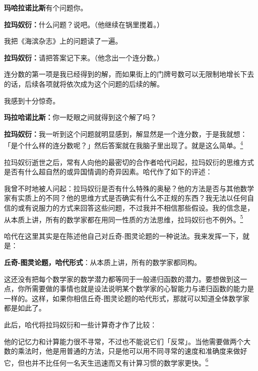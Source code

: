 \documentclass[
  12pt,
  twoside,
  openright,
  oldfontcommands,
]{memoir}
\newcommand{\kaitismall}[1]{{\kaitifamily\small #1}}
\newcommand{\heititext}[1]{{\heifamily\bfseries #1}}
\newcommand{\dialogname}[1]{{\heifamily\bfseries #1}}
\newenvironment{fsquote}{%
  \begin{mdframed}[style=gebquote]\kaitifamily\small%
}{%
  \end{mdframed}%
}
\begin{document}
\dialogname{玛哈拉诺比斯}有个问题你。

\dialogname{拉玛奴衍：}什么问题？说吧。\kaitismall{（他继续在锅里搅着。）}

\begin{fsquote}
我把《海滨杂志》上的问题读了一遍。
\end{fsquote}

\dialogname{拉玛奴衍：}请把答案记下来。\kaitismall{（他念出一个连分数。）}

连分数的第一项是我已经得到的解，而如果街上的门牌号数可以无限制地增长下去的话，后续各项就将依次成为这个问题的后续的解。

\begin{fsquote}
我感到十分惊奇。
\end{fsquote}

\dialogname{玛拉哈诺比斯：}你一眨眼之间就得到这个解了吗？

\dialogname{拉玛奴衍：}我一听到这个问题就明显感到，解显然是一个连分数，于是我就想：「是个什么样的连分数呢？」然后答案就在我脑子里出现了。就是这么简单。\hyperref[fn:Chapter17-4]{\textsuperscript{4}}

拉玛奴衍逝世之后，常有人向他的最密切的合作者哈代问起，拉玛奴衍的思维方式是否有什么超自然的或异国情调的奇异因素。哈代作了如下的评述：

\begin{fsquote}
我曾不时地被人问起：拉玛奴衍是否有什么特殊的奥秘？他的方法是否与其他数学家有实质上的不同？他的思维方式是否确实有什么不正规的东西？我无法以任何自信的或有说服力的方式来回答这些问题，不过我并不相信那些假设。我的信念是，从本质上讲，所有的数学家都在用同一性质的方法思维，拉玛奴衍也不例外。\hyperref[fn:Chapter17-5]{\textsuperscript{5}}
\end{fsquote}

哈代在这里其实是在陈述他自己对丘奇-图灵论题的一种说法。我来发挥一下，就是：

\heititext{丘奇-图灵论题，哈代形式}：从本质上讲，所有的数学家都同构。

这还没有把每个数学家的数学潜力都等同于一般递归函数的潜力。要想做到这一点，你所需要做的事情也就是设法说明某个数学家的心智能力与递归函数的能力是一样的。这样，如果你相信丘奇-图灵论题的哈代形式，那就可以知道全体数学家都是如此了。

此后，哈代将拉玛奴衍和一些计算奇才作了比较：

\begin{fsquote}
他的记忆力和计算能力很不寻常，不过也不能说它们「反常」。当他需要做两个大数的乘法时，他是用普通的方法，只是他可以用不同寻常的速度和准确度来做好它，但也并不比任何一名天生迅速而又有计算习惯的数学家更快。\hyperref[fn:Chapter17-6]{\textsuperscript{6}}
\end{fsquote}
\end{document}
